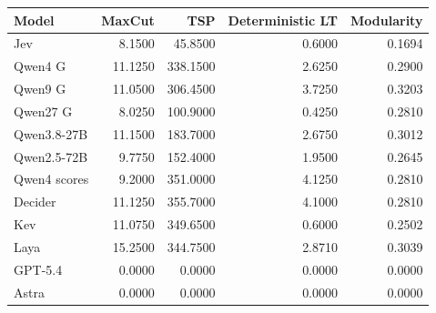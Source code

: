 \begin{tabular}{lrrrr}
\toprule
Model & MaxCut & TSP & Deterministic LT & Modularity \\
\midrule
Jev & 8.1500 & 45.8500 & 0.6000 & 0.1694 \\
Qwen4 G & 11.1250 & 338.1500 & 2.6250 & 0.2900 \\
Qwen9 G & 11.0500 & 306.4500 & 3.7250 & 0.3203 \\
Qwen27 G & 8.0250 & 100.9000 & 0.4250 & 0.2810 \\
Qwen3.8-27B & 11.1500 & 183.7000 & 2.6750 & 0.3012 \\
Qwen2.5-72B & 9.7750 & 152.4000 & 1.9500 & 0.2645 \\
Qwen4 scores & 9.2000 & 351.0000 & 4.1250 & 0.2810 \\
Decider & 11.1250 & 355.7000 & 4.1000 & 0.2810 \\
Kev & 11.0750 & 349.6500 & 0.6000 & 0.2502 \\
Laya & 15.2500 & 344.7500 & 2.8710 & 0.3039 \\
\midrule
GPT-5.4 & 0.0000 & 0.0000 & 0.0000 & 0.0000 \\
Astra & 0.0000 & 0.0000 & 0.0000 & 0.0000 \\
\bottomrule
\end{tabular}
